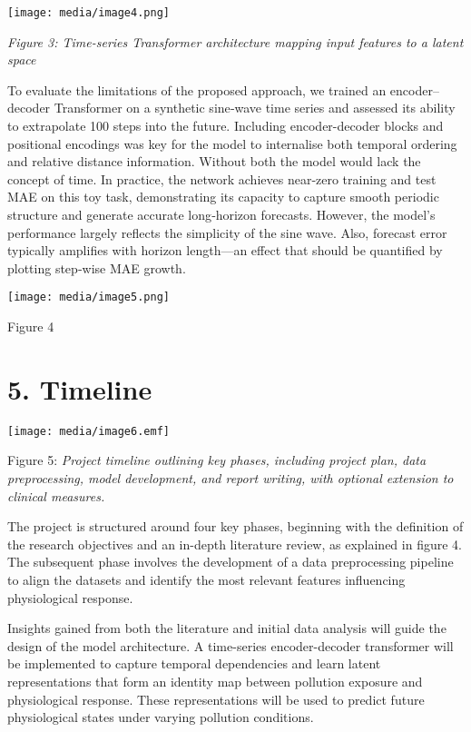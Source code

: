 \documentclass[
]{article}
\begin{document}
\texttt{[image: media/image4.png]}

\emph{Figure 3: Time-series Transformer architecture mapping input
features to a latent space}

To evaluate the limitations of the proposed approach, we trained an
encoder--decoder Transformer on a synthetic sine‐wave time series and
assessed its ability to extrapolate 100 steps into the future. Including
encoder-decoder blocks and positional encodings was key for the model to
internalise both temporal ordering and relative distance information.
Without both the model would lack the concept of time. In practice, the
network achieves near‐zero training and test MAE on this toy task,
demonstrating its capacity to capture smooth periodic structure and
generate accurate long‐horizon forecasts. However, the model's
performance largely reflects the simplicity of the sine wave. Also,
forecast error typically amplifies with horizon length---an effect that
should be quantified by plotting step‐wise MAE growth.

\texttt{[image: media/image5.png]}

Figure 4

\hypertarget{timeline}{%
\section{5. Timeline}\label{timeline}}

\texttt{[image: media/image6.emf]}

Figure 5: \emph{Project timeline outlining key phases, including project
plan, data preprocessing, model development, and report writing, with
optional extension to clinical measures.}

The project is structured around four key phases, beginning with the
definition of the research objectives and an in-depth literature review,
as explained in figure 4. The subsequent phase involves the development
of a data preprocessing pipeline to align the datasets and identify the
most relevant features influencing physiological response.

Insights gained from both the literature and initial data analysis will
guide the design of the model architecture. A time-series
encoder-decoder transformer will be implemented to capture temporal
dependencies and learn latent representations that form an identity map
between pollution exposure and physiological response. These
representations will be used to predict future physiological states
under varying pollution conditions.
\end{document}
